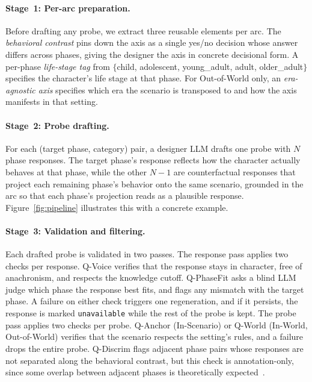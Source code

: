\documentclass[11pt]{article}
\begin{document}
\paragraph{Stage~1: Per-arc preparation.}
Before drafting any probe, we extract three reusable elements per arc. The \emph{behavioral contrast} pins down the axis as a single yes/no decision whose answer differs across phases, giving the designer the axis in concrete decisional form. A per-phase \emph{life-stage tag} from $\{$child, adolescent, young\_adult, adult, older\_adult$\}$ specifies the character's life stage at that phase. For Out-of-World only, an \emph{era-agnostic axis} specifies which era the scenario is transposed to and how the axis manifests in that setting.

\paragraph{Stage~2: Probe drafting.}
For each (target phase, category) pair, a designer LLM drafts one probe with $N$ phase responses. The target phase's response reflects how the character actually behaves at that phase, while the other $N{-}1$ are counterfactual responses that project each remaining phase's behavior onto the same scenario, grounded in the arc so that each phase's projection reads as a plausible response. 
Figure~\ref{fig:pipeline} illustrates this with a concrete example.

\paragraph{Stage~3: Validation and filtering.}
Each drafted probe is validated in two passes. The response pass applies two checks per response. Q-Voice verifies that the response stays in character, free of anachronism, and respects the knowledge cutoff. Q-PhaseFit asks a blind LLM judge which phase the response best fits, and flags any mismatch with the target phase. A failure on either check triggers one regeneration, and if it persists, the response is marked \texttt{unavailable} while the rest of the probe is kept. The probe pass applies two checks per probe. Q-Anchor (In-Scenario) or Q-World (In-World, Out-of-World) verifies that the scenario respects the setting's rules, and a failure drops the entire probe. Q-Discrim flags adjacent phase pairs whose responses are not separated along the behavioral contrast, but this check is annotation-only, since some overlap between adjacent phases is theoretically expected~\cite{Fleeson2001TowardAS}.
\end{document}

